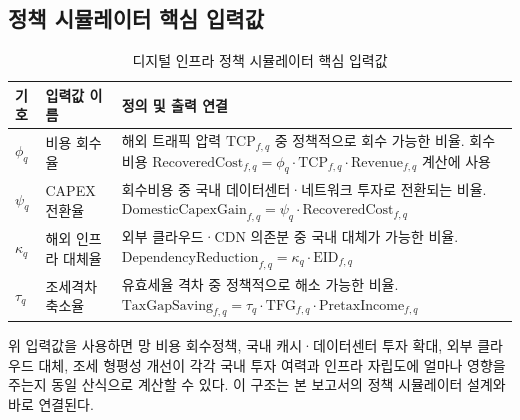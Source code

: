 \documentclass[11pt,a4paper]{report}
\begin{document}
\subsection{정책 시뮬레이터 핵심 입력값}
\begin{table}[H]
  \centering
  \small
  \caption{디지털 인프라 정책 시뮬레이터 핵심 입력값}\label{tab:infra_simulator_inputs}
  \begin{tabular}{p{2.2cm}p{3.2cm}p{6.8cm}}
    \toprule
    \rowcolor{ReportTableHead}
    기호 & 입력값 이름 & 정의 및 출력 연결 \\
    \midrule
    $\phi_q$ & 비용 회수율 & 해외 트래픽 압력 $\mathrm{TCP}_{f,q}$ 중 정책적으로 회수 가능한 비율. 회수비용 $\mathrm{RecoveredCost}_{f,q}=\phi_q \cdot \mathrm{TCP}_{f,q} \cdot \mathrm{Revenue}_{f,q}$ 계산에 사용 \\
    $\psi_q$ & CAPEX 전환율 & 회수비용 중 국내 데이터센터·네트워크 투자로 전환되는 비율. $\mathrm{DomesticCapexGain}_{f,q}=\psi_q \cdot \mathrm{RecoveredCost}_{f,q}$ \\
    $\kappa_q$ & 해외 인프라 대체율 & 외부 클라우드·CDN 의존분 중 국내 대체가 가능한 비율. $\mathrm{DependencyReduction}_{f,q}=\kappa_q \cdot \mathrm{EID}_{f,q}$ \\
    $\tau_q$ & 조세격차 축소율 & 유효세율 격차 중 정책적으로 해소 가능한 비율. $\mathrm{TaxGapSaving}_{f,q}=\tau_q \cdot \mathrm{TFG}_{f,q} \cdot \mathrm{PretaxIncome}_{f,q}$ \\
    \bottomrule
  \end{tabular}
\end{table}

위 입력값을 사용하면 망 비용 회수정책, 국내 캐시·데이터센터 투자 확대, 외부 클라우드 대체, 조세 형평성 개선이 각각 국내 투자 여력과 인프라 자립도에 얼마나 영향을 주는지 동일 산식으로 계산할 수 있다. 이 구조는 본 보고서의 정책 시뮬레이터 설계와 바로 연결된다.
\end{document}
